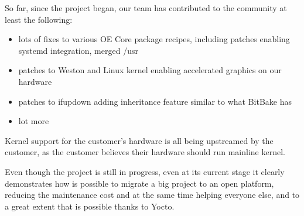 \documentclass[10pt, a5paper]{article}
\begin{document}
So far, since the project began, our team has contributed to the community at least the following:

\begin{itemize}
  \item lots of fixes to various OE Core package recipes, including patches enabling systemd integration, merged /usr
  \item patches to Weston and Linux kernel enabling accelerated graphics on our hardware
  \item patches to ifupdown adding inheritance feature similar to what BitBake has
  \item lot more
\end{itemize}

Kernel support for the customer's hardware is all being upstreamed by the customer, as the customer believes their hardware should run mainline kernel.

Even though the project is still in progress, even at its current stage it clearly demonstrates how is possible to migrate a big project to an open platform, reducing the maintenance cost and at the same time helping everyone else, and to a great extent that is possible thanks to Yocto.
\end{document}
